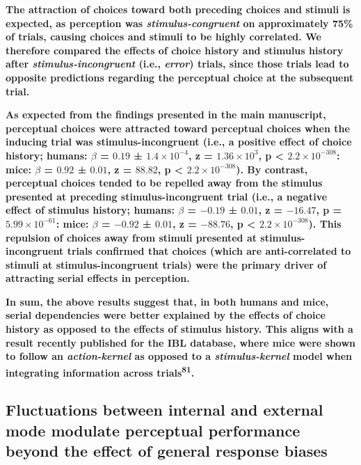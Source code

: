 \documentclass[
]{article}
\begin{document}
\textbf{The attraction of choices toward both preceding choices and
stimuli is expected, as perception was \emph{stimulus-congruent} on
approximately 75\% of trials, causing choices and stimuli to be highly
correlated. We therefore compared the effects of choice history and
stimulus history after \emph{stimulus-incongruent} (i.e., \emph{error})
trials, since those trials lead to opposite predictions regarding the
perceptual choice at the subsequent trial.}

\textbf{As expected from the findings presented in the main manuscript,
perceptual choices were attracted toward perceptual choices when the
inducing trial was stimulus-incongruent (i.e., a positive effect of
choice history; humans: \(\beta\) = \(0.19\) ±
\(\ensuremath{1.4\times 10^{-4}}\), z =
\(\ensuremath{1.36\times 10^{3}}\), p < \(\ensuremath{2.2\times 10^{-308}}\): mice: \(\beta\) =
\(0.92\) ± \(0.01\), z = \(88.82\), p < \(\ensuremath{2.2\times 10^{-308}}\)). By contrast, perceptual
choices tended to be repelled away from the stimulus presented at
preceding stimulus-incongruent trial (i.e., a negative effect of
stimulus history; humans: \(\beta\) = \(-0.19\) ± \(0.01\), z =
\(-16.47\), p = \(\ensuremath{5.99\times 10^{-61}}\): mice: \(\beta\) =
\(-0.92\) ± \(0.01\), z = \(-88.76\), p < \(\ensuremath{2.2\times 10^{-308}}\)). This repulsion of
choices away from stimuli presented at stimulus-incongruent trials
confirmed that choices (which are anti-correlated to stimuli at
stimulus-incongruent trials) were the primary driver of attracting
serial effects in perception.}

\textbf{In sum, the above results suggest that, in both humans and mice,
serial dependencies were better explained by the effects of choice
history as opposed to the effects of stimulus history. This aligns with
a result recently published for the IBL database, where mice were shown
to follow an \emph{action-kernel} as opposed to a \emph{stimulus-kernel}
model when integrating information across trials\textsuperscript{81}.}

\hypertarget{fluctuations-between-internal-and-external-mode-modulate-perceptual-performance-beyond-the-effect-of-general-response-biases}{%
\subsection{Fluctuations between internal and external mode modulate
perceptual performance beyond the effect of general response
biases}\label{fluctuations-between-internal-and-external-mode-modulate-perceptual-performance-beyond-the-effect-of-general-response-biases}}
\end{document}

